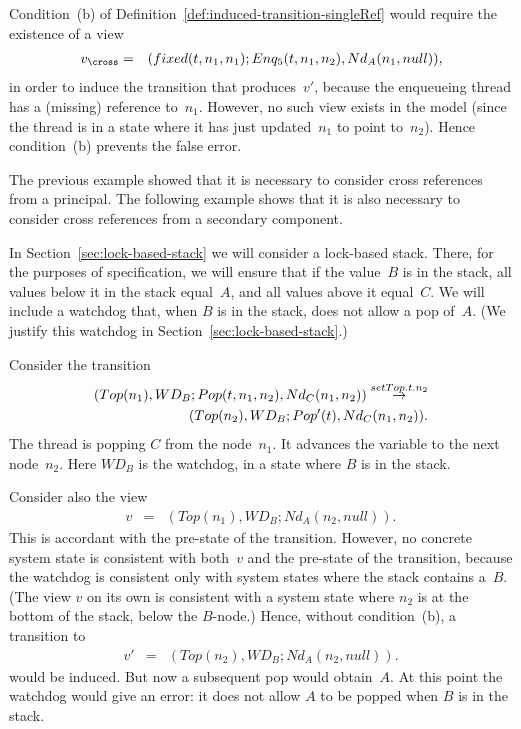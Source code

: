 Condition~(b) of Definition~\ref{def:induced-transition-singleRef} would
require the existence of a view
\begin{eqnarray*}
v_\cross & = & (fixed(t, n_1, n_1); Enq_5(t, n_1, n_2), Nd_A(n_1, null)),
\end{eqnarray*}
in order to induce the transition that produces~$v'$, because the enqueueing
thread has a (missing) reference to~$n_1$.  However, no such view exists in
the model (since the thread is in a state where it has just updated~$n_1$ to
point to~$n_2$).  Hence condition~(b) prevents the false error.


The previous example showed that it is necessary to consider cross references
from a principal.  The following example shows that it is also necessary to
consider cross references from a secondary component.  

In Section~\ref{sec:lock-based-stack} we will consider a lock-based stack.
There, for the purposes of specification, we will ensure that if the value~$B$
is in the stack, all values below it in the stack equal~$A$, and all values
above it equal~$C$.  We will include a watchdog that, when $B$ is in the
stack, does not allow a pop of~$A$.  (We justify this watchdog in
Section~\ref{sec:lock-based-stack}.) 

Consider the transition
\[
\begin{align}
(Top(n_1), WD_B ; Pop(t, n_1, n_2), Nd_C(n_1, n_2)) \stackrel{setTop.t.n_2}\rightarrow \\
\qquad  (Top(n_2), WD_B ; Pop'(t), Nd_C(n_1, n_2)) .
\end{align}
\]
The thread is popping $C$ from the node~$n_1$.  It advances the
 variable to the next node~$n_2$.  Here $WD_B$ is the watchdog, in
a state where $B$ is in the stack.  

Consider also the view
\begin{eqnarray*}
v & = & (Top(n_1), WD_B ;  Nd_A(n_2, null)).
\end{eqnarray*}
This is accordant with the pre-state of the transition.  However, no concrete
system state is consistent with both~$v$ and the pre-state of the transition,
because the watchdog is consistent only with system states where the stack
contains a~$B$.  (The view $v$ on its own is consistent with a system state
where $n_2$ is at the bottom of the stack, below the $B$-node.)  Hence,
without condition~(b), a transition to
\begin{eqnarray*}
v' & = & (Top(n_2), WD_B ;  Nd_A(n_2, null)).
\end{eqnarray*}
would be induced.  But now a subsequent pop would obtain~$A$.  At this point
the watchdog would give an error: it does not allow $A$ to be popped when $B$
is in the stack.

